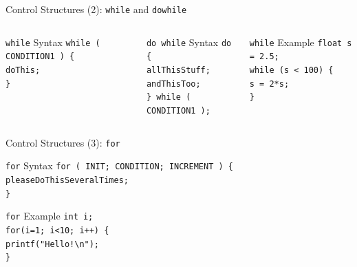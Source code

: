 \documentclass[compress]{beamer}
\newcommand{\tab}{\hspace*{1em}}
\begin{document}
    \begin{frame}{Control Structures (2): \texttt{while} and \texttt{dowhile}}
    	\begin{columns}
    		\column[t]{5cm}
    		\begin{exampleblock}{\texttt{while} Syntax}
    			\texttt{while ( CONDITION1 ) \{ \\
    				\tab doThis; \\
    				\} \\
    			}
    		\end{exampleblock}
    		
    		\begin{exampleblock}{\texttt{do while} Syntax}
    			\texttt{do \{ \\
    				\tab allThisStuff; \\
    				\tab andThisToo; \\
    				\} while ( CONDITION1 );
    			}
    		\end{exampleblock}
    		\column[t]{5cm}
    		\begin{exampleblock}{\texttt{while} Example}
    			\texttt{float s = 2.5; \\
    				while (s < 100) \{\\ 
    				\tab s = 2*s;\\
    				\}
    			}
    		\end{exampleblock}
    	\end{columns}
    \end{frame}
    
    \begin{frame}{Control Structures (3): \texttt{for}}
    	\begin{exampleblock}{\texttt{for} Syntax}
    		\texttt{for ( INIT; CONDITION; INCREMENT ) \{ \\
    			\tab pleaseDoThisSeveralTimes; \\                
    			\}
    		}
    	\end{exampleblock}
    	\begin{exampleblock}{\texttt{for} Example}
    		\texttt{int i; \\
    			for(i=1; i<10; i++) \{ \\
    			\tab printf("Hello!\textbackslash n"); \\
    			\} \\
    		}
    	\end{exampleblock}
    \end{frame}
    
\end{document}
